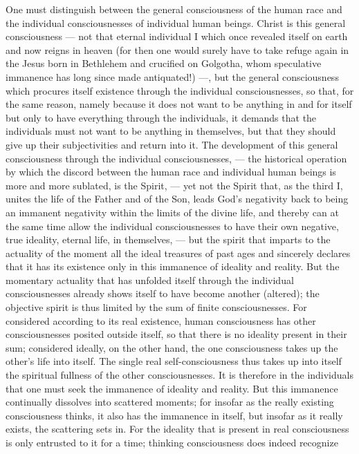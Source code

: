 \documentclass[12pt]{book}
\newcommand{\opage}[1]{\marginnote{\footnotesize\textit{[#1]}}}
\begin{document}
One must distinguish between the general consciousness of the human race and
the individual consciousnesses of individual human beings. Christ is this
general consciousness --- not that eternal individual I which once revealed
itself on earth and now reigns in heaven (for then one would surely have to take
refuge again in the Jesus born in Bethlehem and crucified on Golgotha, whom
speculative immanence has long since made antiquated!) ---, but the general
consciousness which procures itself existence through the individual
consciousnesses, so that, for the same reason, namely because it does not want
to be anything in and for itself but only to have everything through the
individuals, it demands that the individuals must not want to be anything in
themselves, but that they should give up their subjectivities and return into
it. The development of this general consciousness through the individual
consciousnesses, --- the historical operation by which the discord between the
human race and individual human beings is more and more sublated, is the Spirit,
--- yet not the Spirit that, as the third I, unites the life of the Father and
of the Son, leads God's negativity back to being an immanent negativity within
the limits of the divine life, and thereby can at the same time allow the
individual consciousnesses to have their own negative, true ideality, eternal
life, in themselves, --- but the spirit that imparts to the actuality of the
moment all the ideal treasures of past ages and sincerely declares that it has
its existence only in this immanence of ideality and reality. But the momentary
actuality that has unfolded itself through the individual consciousnesses
already shows itself to have become another (altered); the objective spirit is
thus limited by the sum of finite consciousnesses. For considered according to
its real existence, human consciousness has other
\opage{141} consciousnesses posited outside itself, so that there is no ideality
present in their sum; considered ideally, on the other hand, the one
consciousness takes up the other's life into itself. The single real
self-consciousness thus takes up into itself the spiritual fullness of the other
consciousnesses. It is therefore in the individuals that one must seek the
immanence of ideality and reality. But this immanence continually dissolves into
scattered moments; for insofar as the really existing consciousness thinks, it
also has the immanence in itself, but insofar as it really exists, the
scattering sets in. For the ideality that is present in real consciousness is
only entrusted to it for a time; thinking consciousness does indeed recognize
\end{document}
